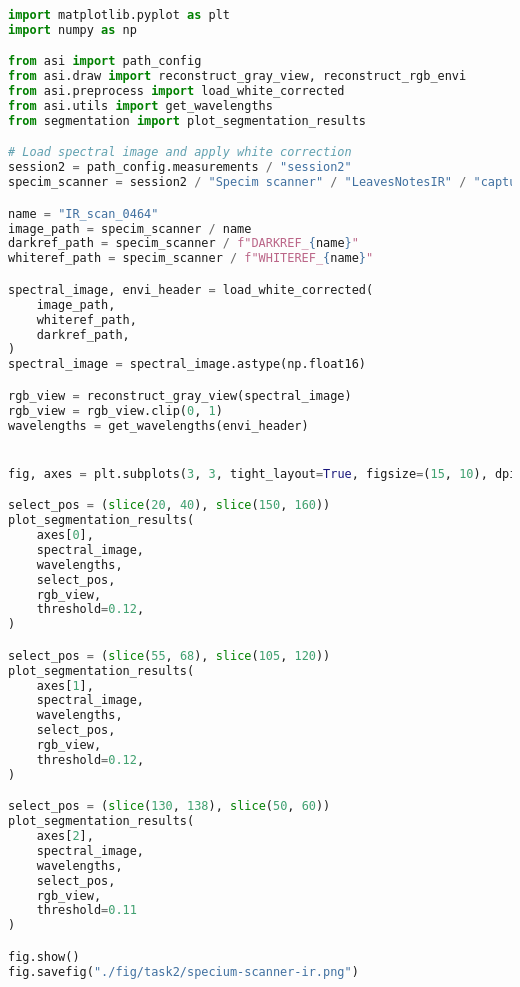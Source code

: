 \begin{lstlisting}[language=python, caption=Segmentation of leaves by Specim Scnaner in visible wavelengths, label={code:leaves-specim-vis}]
import matplotlib.pyplot as plt
import numpy as np

from asi import path_config
from asi.draw import reconstruct_gray_view, reconstruct_rgb_envi
from asi.preprocess import load_white_corrected
from asi.utils import get_wavelengths
from segmentation import plot_segmentation_results

# Load spectral image and apply white correction
session2 = path_config.measurements / "session2"
specim_scanner = session2 / "Specim scanner" / "LeavesNotesIR" / "capture"

name = "IR_scan_0464"
image_path = specim_scanner / name
darkref_path = specim_scanner / f"DARKREF_{name}"
whiteref_path = specim_scanner / f"WHITEREF_{name}"

spectral_image, envi_header = load_white_corrected(
    image_path,
    whiteref_path,
    darkref_path,
)
spectral_image = spectral_image.astype(np.float16)

rgb_view = reconstruct_gray_view(spectral_image)
rgb_view = rgb_view.clip(0, 1)
wavelengths = get_wavelengths(envi_header)


fig, axes = plt.subplots(3, 3, tight_layout=True, figsize=(15, 10), dpi=80)

select_pos = (slice(20, 40), slice(150, 160))
plot_segmentation_results(
    axes[0],
    spectral_image,
    wavelengths,
    select_pos,
    rgb_view,
    threshold=0.12,
)

select_pos = (slice(55, 68), slice(105, 120))
plot_segmentation_results(
    axes[1],
    spectral_image,
    wavelengths,
    select_pos,
    rgb_view,
    threshold=0.12,
)

select_pos = (slice(130, 138), slice(50, 60))
plot_segmentation_results(
    axes[2],
    spectral_image,
    wavelengths,
    select_pos,
    rgb_view,
    threshold=0.11
)

fig.show()
fig.savefig("./fig/task2/specium-scanner-ir.png")
\end{lstlisting}